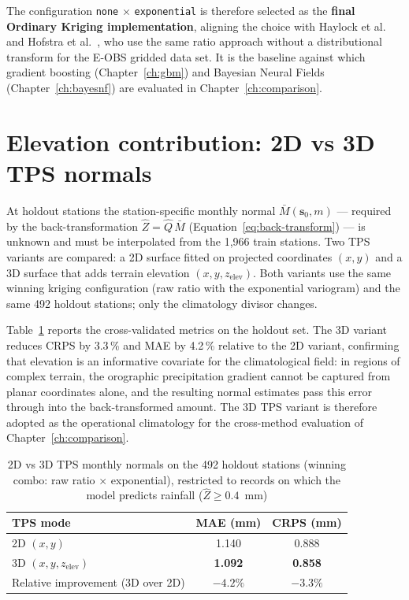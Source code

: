The configuration \texttt{none} $\times$ \texttt{exponential} is therefore
selected as the \textbf{final Ordinary Kriging implementation},
aligning the choice with Haylock et al.~\cite{haylock2008european} and
Hofstra et al.~\cite{hofstra2008comparison}, who use the same ratio
approach without a distributional transform for the E-OBS gridded
data set. It is the baseline against which gradient boosting
(Chapter~\ref{ch:gbm}) and Bayesian Neural Fields
(Chapter~\ref{ch:bayesnf}) are evaluated in
Chapter~\ref{ch:comparison}.

\section{Elevation contribution: 2D vs 3D TPS normals}
\label{sec:tps-experiment}

At holdout stations the station-specific monthly normal
$\bar{M}(\mathbf{s}_0, m)$ — required by the back-transformation
$\hat{Z} = \hat{Q}\,\bar{M}$
(Equation~\eqref{eq:back-transform}) — is unknown and must be interpolated
from the 1{,}966 train stations. Two TPS variants are compared: a 2D
surface fitted on projected coordinates $(x, y)$ and a 3D surface that
adds terrain elevation $(x, y, z_{\text{elev}})$. Both variants use the
same winning kriging configuration (raw ratio with the exponential
variogram) and the same 492 holdout stations; only the climatology
divisor changes.

Table~\ref{tab:tps-experiment} reports the cross-validated metrics on the
holdout set. The 3D variant reduces CRPS by 3.3\,\% and MAE by 4.2\,\%
relative to the 2D variant, confirming that elevation is an informative
covariate for the climatological field: in regions of
complex terrain, the orographic precipitation gradient cannot be captured
from planar coordinates alone, and the resulting normal estimates pass
this error through into the back-transformed amount. The 3D TPS variant
is therefore adopted as the operational climatology for the
cross-method evaluation of Chapter~\ref{ch:comparison}.

\begin{table}[ht]
  \centering
  \caption{2D vs 3D TPS monthly normals on the 492 holdout stations
  (winning combo: raw ratio $\times$ exponential), restricted to
  records on which the model predicts rainfall
  ($\hat{Z} \ge 0{.}4$~mm)}
  \label{tab:tps-experiment}
  \begin{tabular}{l cc}
    \toprule
    TPS mode & MAE (mm) & CRPS (mm) \\
    \midrule
    2D $(x, y)$              & 1.140 & 0.888 \\
    3D $(x, y, z_{\text{elev}})$ & \textbf{1.092} & \textbf{0.858} \\
    \midrule
    Relative improvement (3D over 2D) & $-4.2\%$ & $-3.3\%$ \\
    \bottomrule
  \end{tabular}
\end{table}


